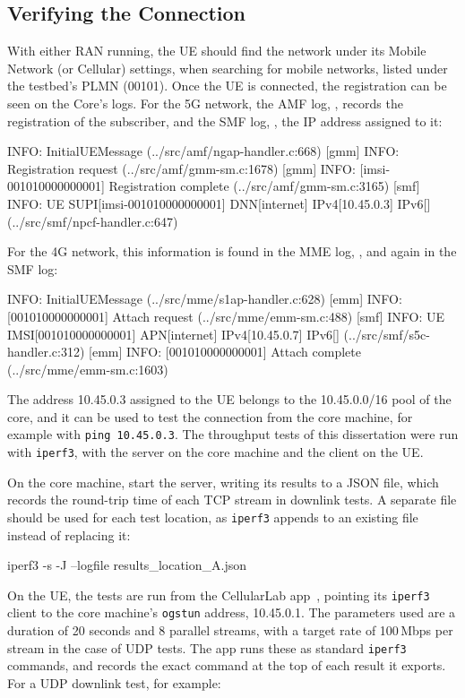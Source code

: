 \subsection{Verifying the Connection}
\label{sec:app-verify}
With either \gls{RAN} running, the \gls{UE} should find the network under its Mobile Network (or Cellular) settings, when searching for mobile networks, listed under the testbed's \gls{PLMN} (00101). Once the \gls{UE} is connected, the registration can be seen on the Core's logs. For the 5G network, the \gls{AMF} log, , records the registration of the subscriber, and the \gls{SMF} log, , the IP address assigned to it:
\begin{code}
[amf] INFO: InitialUEMessage (../src/amf/ngap-handler.c:668)
[gmm] INFO: Registration request (../src/amf/gmm-sm.c:1678)
[gmm] INFO: [imsi-001010000000001] Registration complete (../src/amf/gmm-sm.c:3165)
[smf] INFO: UE SUPI[imsi-001010000000001] DNN[internet] IPv4[10.45.0.3] IPv6[] (../src/smf/npcf-handler.c:647)
\end{code}
For the 4G network, this information is found in the \gls{MME} log, , and again in the \gls{SMF} log:
\begin{code}
[mme] INFO: InitialUEMessage (../src/mme/s1ap-handler.c:628)
[emm] INFO: [001010000000001] Attach request (../src/mme/emm-sm.c:488)
[smf] INFO: UE IMSI[001010000000001] APN[internet] IPv4[10.45.0.7] IPv6[] (../src/smf/s5c-handler.c:312)
[emm] INFO: [001010000000001] Attach complete (../src/mme/emm-sm.c:1603)
\end{code}
The address 10.45.0.3 assigned to the \gls{UE} belongs to the 10.45.0.0/16 pool of the core, and it can be used to test the connection from the core machine, for example with \texttt{ping 10.45.0.3}. The throughput tests of this dissertation were run with \texttt{iperf3}, with the server on the core machine and the client on the \gls{UE}.

On the core machine, start the server, writing its results to a JSON file, which records the round-trip time of each TCP stream in downlink tests. A separate file should be used for each test location, as \texttt{iperf3} appends to an existing file instead of replacing it:

\begin{code}
iperf3 -s -J --logfile results_location_A.json
\end{code}

On the \gls{UE}, the tests are run from the CellularLab app~\cite{cellularlab}, pointing its \texttt{iperf3} client to the core machine's \texttt{ogstun} address, 10.45.0.1. The parameters used are a duration of 20 seconds and 8 parallel streams, with a target rate of 100\,Mbps per stream in the case of UDP tests. The app runs these as standard \texttt{iperf3} commands, and records the exact command at the top of each result it exports. For a UDP downlink test, for example:

